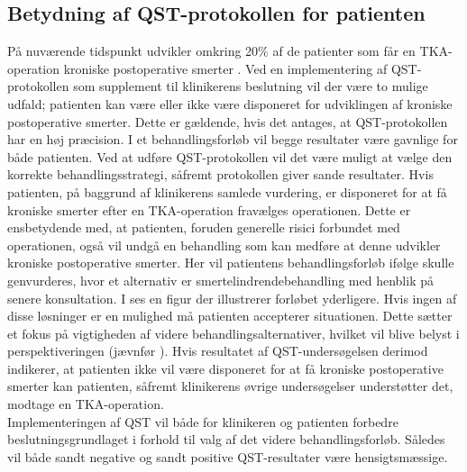 \subsection{Betydning af QST-protokollen for patienten}
På nuværende tidspunkt udvikler omkring 20\% af de patienter som får en TKA-operation kroniske postoperative smerter \citep{Beswick2012}. Ved en implementering af QST-protokollen som supplement til klinikerens beslutning vil der være to mulige udfald; patienten kan være eller ikke være disponeret for udviklingen af kroniske postoperative smerter. Dette er gældende, hvis det antages, at QST-protokollen har en høj præcision. I et behandlingsforløb vil begge resultater være gavnlige for både patienten. Ved at udføre QST-protokollen vil det være muligt at vælge den korrekte behandlingsstrategi, såfremt protokollen giver sande resultater. Hvis patienten, på baggrund af klinikerens samlede vurdering, er disponeret for at få kroniske smerter efter en TKA-operation fravælges operationen. Dette er ensbetydende med, at patienten, foruden generelle risici forbundet med operationen, også vil undgå en behandling som kan medføre at denne udvikler kroniske postoperative smerter. Her vil patientens behandlingsforløb ifølge  skulle genvurderes, hvor et alternativ er smertelindrendebehandling med henblik på senere konsultation. I  ses en figur der illustrerer forløbet yderligere. Hvis ingen af disse løsninger er en mulighed må patienten accepterer situationen. Dette sætter et fokus på vigtigheden af videre behandlingsalternativer, hvilket vil blive belyst i perspektiveringen (jævnfør ). Hvis resultatet af QST-undersøgelsen derimod indikerer, at patienten ikke vil være disponeret for at få kroniske postoperative smerter kan patienten, såfremt klinikerens øvrige undersøgelser understøtter det, modtage en TKA-operation. \\
Implementeringen af QST vil både for klinikeren og patienten forbedre beslutningsgrundlaget i forhold til valg af det videre behandlingsforløb. Således vil både sandt negative og sandt positive QST-resultater være hensigtsmæssige.


